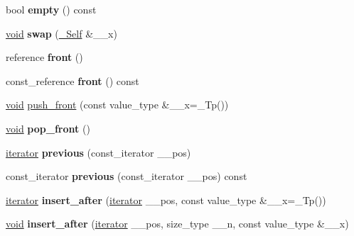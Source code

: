 \begin{DoxyCompactItemize}
\item 
\mbox{\label{classslist_accbdbeca5e98ff3bee44b0476f423c4c}} 
bool {\bfseries empty} () const
\item 
\mbox{\label{classslist_a0690c1e87951ec400f4cfbc95ef4cd3c}} 
\hyperlink{interfacevoid}{void} {\bfseries swap} (\hyperlink{classslist}{\+\_\+\+Self} \&\+\_\+\+\_\+x)
\item 
\mbox{\label{classslist_aaa960fb7e240e1fed96ce790d2e4cf8d}} 
reference {\bfseries front} ()
\item 
\mbox{\label{classslist_a5c191555457df3d83234351b75aa1bb7}} 
const\+\_\+reference {\bfseries front} () const
\item 
\hyperlink{interfacevoid}{void} \hyperlink{classslist_a820c857644421cf406746b4ea5982582}{push\+\_\+front} (const value\+\_\+type \&\+\_\+\+\_\+x=\+\_\+\+Tp())
\item 
\mbox{\label{classslist_ab746dd98195870a8b229ee4213d11a07}} 
\hyperlink{interfacevoid}{void} {\bfseries pop\+\_\+front} ()
\item 
\mbox{\label{classslist_af2814f2581be6b2174cfe7b83281537c}} 
\hyperlink{structiterator}{iterator} {\bfseries previous} (const\+\_\+iterator \+\_\+\+\_\+pos)
\item 
\mbox{\label{classslist_af4ed2e438e231f0750e84f29b943d7a6}} 
const\+\_\+iterator {\bfseries previous} (const\+\_\+iterator \+\_\+\+\_\+pos) const
\item 
\mbox{\label{classslist_a6457067f54e6e85cc5aed6662f2ee2a9}} 
\hyperlink{structiterator}{iterator} {\bfseries insert\+\_\+after} (\hyperlink{structiterator}{iterator} \+\_\+\+\_\+pos, const value\+\_\+type \&\+\_\+\+\_\+x=\+\_\+\+Tp())
\item 
\mbox{\label{classslist_aa98831e0d2cbbc18559a4aa76bee1c1e}} 
\hyperlink{interfacevoid}{void} {\bfseries insert\+\_\+after} (\hyperlink{structiterator}{iterator} \+\_\+\+\_\+pos, size\+\_\+type \+\_\+\+\_\+n, const value\+\_\+type \&\+\_\+\+\_\+x)
\item 
\mbox{\label{classslist_a5ec7ba3a0ba98e46ffea1f26fa6b7120}} 

\end{DoxyCompactItemize}

